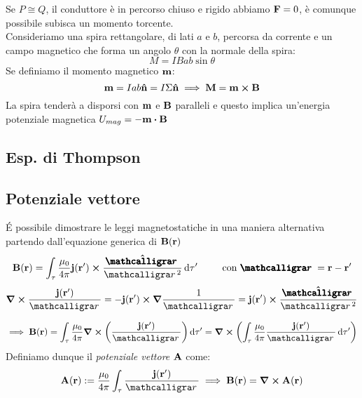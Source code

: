 \documentclass[12pt,a4paper]{article}
\begin{document}
Se $P\cong Q$, il conduttore è in percorso chiuso e rigido abbiamo $\vb{F}= 0$, è comunque possibile subisca un momento torcente.
\\Consideriamo una spira rettangolare, di lati $a$ e $b$, percorsa da corrente e un campo magnetico che forma un angolo $\theta$ con la normale della spira:
\begin{equation*}
    M= IBab\sin\theta
\end{equation*}
Se definiamo il momento magnetico $\vb{m}$:
\begin{equation*}
    \vb{m}= Iab\vu{n}= I\Sigma\vu{n}\implies \vb{M}= \vb{m}\cp\vb{B}
\end{equation*}
La spira tenderà a disporsi con $\vb{m}$ e $\vb{B}$ paralleli e questo implica un'energia potenziale magnetica $U_{mag}= -\vb{m}\vdot\vb{B}$


\subsection{Esp. di Thompson}

\subsection{Potenziale vettore}
\'{E} possibile dimostrare le leggi magnetostatiche in una maniera alternativa partendo dall'equazione generica di $\vb{B}(\vb{r})$
\begin{equation*}
    \vb{B}(\vb{r})= \int_\tau\frac{\mu_0}{4\pi}\vb{j}(\vb{r}')\cp\frac{\vu{\boldscriptr}}{\scriptr^2}\dd{\tau'} \qquad\text{ con } 
    \boldscriptr= \vb{r}-\vb{r}'
\end{equation*}
\begin{equation*}
    \curl \frac{\vb{j}(\vb{r}')}{\scriptr}= -\vb{j}(\vb{r}')\cp\grad{\frac{1}{\scriptr}}= \vb{j}(\vb{r}')\cp\frac{\vu{\boldscriptr}}{\scriptr^2}
\end{equation*}

\begin{equation*}
    \implies \vb{B}(\vb{r})= \int_\tau\frac{\mu_0}{4\pi}\curl(\frac{\vb{j}(\vb{r}')}{\scriptr})\dd{\tau'}= \curl(\int_\tau\frac{\mu_0}{4\pi}\frac{\vb{j}(\vb{r}')}{\scriptr}\dd{\tau'})
\end{equation*}
Definiamo dunque il \textit{potenziale vettore} $\vb{A}$ come:
\begin{equation*}
    \vb{A}(\vb{r}):=\frac{\mu_0}{4\pi}\int_\tau \frac{\vb{j}(\vb{r}')}{\scriptr}\implies\vb{B}(\vb{r})= \curl{\vb{A}(\vb{r})}
\end{equation*}
\end{document}
